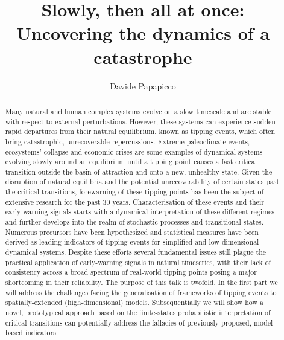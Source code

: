 \documentclass[../main.tex]{subfiles}
\begin{document}
\title{Slowly, then all at once: Uncovering the dynamics of a catastrophe}

\author{Davide Papapicco}

\date{}

\maketitle

\begin{abstract}
        Many natural and human complex systems evolve on a slow timescale and are stable with respect to external perturbations.
        However, these systems can experience sudden rapid departures from their natural equilibrium, known as tipping events, which often bring catastrophic, unrecoverable repercussions.
        Extreme paleoclimate events, ecosystems' collapse and economic crises are some examples of dynamical systems evolving slowly around an equilibrium until a tipping point causes a fast critical transition outside the basin of attraction and onto a new, unhealthy state.
        Given the disruption of natural equilibria and the potential unrecoverability of certain states past the critical transitions, forewarning of these tipping points has been the subject of extensive research for the past $30$ years.
        Characterisation of these events and their early-warning signals starts with a dynamical interpretation of these different regimes and further develops into the realm of stochastic processes and transitional states.
        Numerous precursors have been hypothesized and statistical measures have been derived as leading indicators of tipping events for simplified and low-dimensional dynamical systems. 
        Despite these efforts several fundamental issues still plague the practical application of early-warning signals in natural timeseries, with their lack of consistency across a broad spectrum of real-world tipping points posing a major shortcoming in their reliability.
        The purpose of this talk is twofold. In the first part we will address the challenges facing the generalisation of frameworks of tipping events to spatially-extended (high-dimensional) models.
        Subsequentially we will show how a novel, prototypical approach based on the finite-states probabilistic interpretation of critical transitions can potentially address the fallacies of previously proposed, model-based indicators.
\end{abstract}
\end{document}
